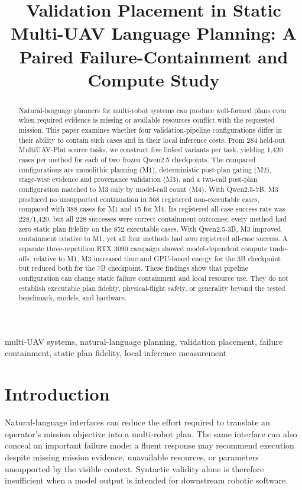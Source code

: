 \documentclass[conference]{IEEEtran}
\title{Validation Placement in Static Multi-UAV Language Planning: A Paired
Failure-Containment and Compute Study}
\author{
\IEEEauthorblockN{Mohammed Alnuwaiser\IEEEauthorrefmark{1} and
Dr.~Aishwarya Tomar\IEEEauthorrefmark{2}}
\IEEEauthorblockA{\IEEEauthorrefmark{1}~ALBA7OOTH Research Lab}
\IEEEauthorblockA{\IEEEauthorrefmark{2}~Assistant Professor, Department of Electronics Engineering,\\
Harcourt Butler Technical University (HBTU), Kanpur, India}
}
\newcommand{\Mone}{\textsc{M1}\xspace}
\newcommand{\Mtwo}{\textsc{M2}\xspace}
\newcommand{\Mthree}{\textsc{M3}\xspace}
\newcommand{\Mfour}{\textsc{M4}\xspace}
\begin{document}
\maketitle

\begin{abstract}
Natural-language planners for multi-robot systems can produce well-formed plans
even when required evidence is missing or available resources conflict with the
requested mission. This paper examines whether four validation-pipeline
configurations differ in their ability to contain such cases and in their local
inference costs. From 284 held-out MultiUAV-Plat source tasks, we construct five
linked variants per task, yielding 1,420 cases per method for each of two frozen
Qwen2.5 checkpoints. The compared configurations are monolithic planning
(\Mone), deterministic post-plan gating (\Mtwo), stage-wise evidence and
provenance validation (\Mthree), and a two-call post-plan configuration matched
to \Mthree only by model-call count (\Mfour). With Qwen2.5-7B, \Mthree produced
no unsupported continuation in 568 registered non-executable cases, compared
with 388 cases for \Mone and 15 for \Mfour. Its registered all-case success rate
was 228/1,420, but all 228 successes were correct containment outcomes; every
method had zero static plan fidelity on the 852 executable cases. With
Qwen2.5-3B, \Mthree improved containment relative to \Mone, yet all four
methods had zero registered all-case success. A separate three-repetition RTX
3090 campaign showed model-dependent compute trade-offs: relative to \Mone,
\Mthree increased time and GPU-board energy for the 3B checkpoint but reduced
both for the 7B checkpoint. These findings show that pipeline configuration can
change static failure containment and local resource use. They do not establish
executable plan fidelity, physical-flight safety, or generality beyond the
tested benchmark, models, and hardware.
\end{abstract}

\begin{IEEEkeywords}
multi-UAV systems, natural-language planning, validation placement, failure
containment, static plan fidelity, local inference measurement
\end{IEEEkeywords}

\section{Introduction}

Natural-language interfaces can reduce the effort required to translate an
operator's mission objective into a multi-robot plan. The same interface can
also conceal an important failure mode: a fluent response may recommend
execution despite missing mission evidence, unavailable resources, or
parameters unsupported by the visible context. Syntactic validity alone is
therefore insufficient when a model output is intended for downstream robotic
software.
\end{document}
